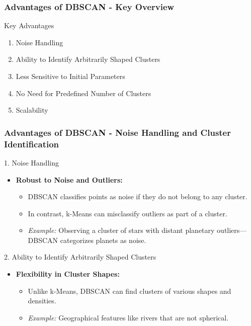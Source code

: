 \documentclass[aspectratio=169]{beamer}
\begin{document}
\begin{frame}[fragile]
    \frametitle{Advantages of DBSCAN - Key Overview}
    \begin{block}{Key Advantages}
        \begin{enumerate}
            \item Noise Handling
            \item Ability to Identify Arbitrarily Shaped Clusters
            \item Less Sensitive to Initial Parameters
            \item No Need for Predefined Number of Clusters
            \item Scalability
        \end{enumerate}
    \end{block}
\end{frame}

\begin{frame}[fragile]
    \frametitle{Advantages of DBSCAN - Noise Handling and Cluster Identification}
    \begin{block}{1. Noise Handling}
        \begin{itemize}
            \item \textbf{Robust to Noise and Outliers:}
            \begin{itemize}
                \item DBSCAN classifies points as noise if they do not belong to any cluster.
                \item In contrast, k-Means can misclassify outliers as part of a cluster.
                \item \textit{Example:} Observing a cluster of stars with distant planetary outliers—DBSCAN categorizes planets as noise.
            \end{itemize}
        \end{itemize}
    \end{block}
    
    \begin{block}{2. Ability to Identify Arbitrarily Shaped Clusters}
        \begin{itemize}
            \item \textbf{Flexibility in Cluster Shapes:}
                \begin{itemize}
                    \item Unlike k-Means, DBSCAN can find clusters of various shapes and densities.
                    \item \textit{Example:} Geographical features like rivers that are not spherical.
                \end{itemize}
        \end{itemize}
    \end{block}
\end{frame}
\end{document}

